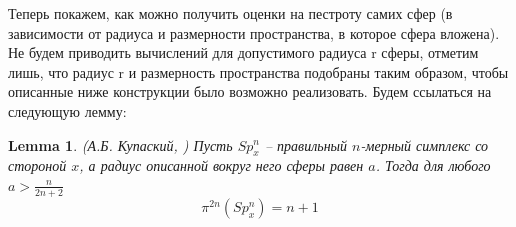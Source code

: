 \documentclass{report}%
\newtheorem{lemma}[theorem]{Lemma}
\begin{document}
Теперь покажем, как можно получить оценки на пестроту самих сфер (в зависимости от радиуса и размерности пространства, в которое сфера вложена). Не будем приводить вычислений для допустимого радиуса r сферы, отметим лишь, что радиус r и размерность пространства подобраны таким образом, чтобы описанные ниже конструкции было возможно реализовать.  Будем ссылаться на следующую лемму:

\begin{lemma} (А.Б. Купаский, \cite{Kupavsky2011})
		Пусть $Sp_x^n$ – правильный $n$-мерный симплекс со стороной $x$,
		а радиус описанной вокруг него сферы равен $a$. Тогда для любого $a > \frac{n}{2n + 2}$
		\begin{equation}
				\pi^{2n}(Sp_x^n) = n+1
		\end{equation}
\end{lemma}
\end{document}
